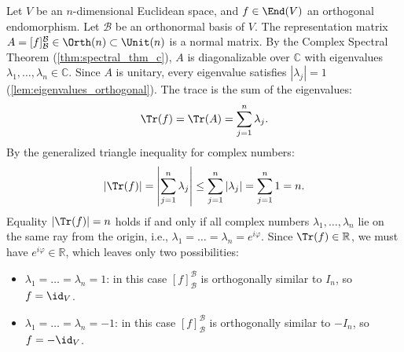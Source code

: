 \begin{exercisesolution}
\label{sol:trace_orthogonal_endomorphism}
Let $V$ be an $n$-dimensional Euclidean space, and $f \in \End(V)$ an orthogonal endomorphism.
Let $\mathcal{B}$ be an orthonormal basis of $V$.
The representation matrix $A = [f]_\mathcal{B}^\mathcal{B} \in \Orth(n) \subset \Unit(n)$ is a normal matrix.
By the Complex Spectral Theorem (\cref{thm:spectral_thm_c}), $A$ is diagonalizable over $\mathbb{C}$ with eigenvalues $\lambda_1, \dots, \lambda_n \in \mathbb{C}$.
Since $A$ is unitary, every eigenvalue satisfies $|\lambda_j| = 1$ (\cref{lem:eigenvalues_orthogonal}).
The trace is the sum of the eigenvalues:
\[
\Tr(f) = \Tr(A) = \sum_{j=1}^n \lambda_j.
\]
By the generalized triangle inequality for complex numbers:
\[
|\Tr(f)| = \left| \sum_{j=1}^n \lambda_j \right| \le \sum_{j=1}^n |\lambda_j| = \sum_{j=1}^n 1 = n.
\]
Equality $|\Tr(f)| = n$ holds if and only if all complex numbers $\lambda_1, \dots, \lambda_n$ lie on the same ray from the origin, i.e., $\lambda_1 = \dots = \lambda_n = e^{i\varphi}$.
Since $\Tr(f) \in \mathbb{R}$, we must have $e^{i\varphi} \in \mathbb{R}$, which leaves only two possibilities:
\begin{itemize}
    \item $\lambda_1 = \dots = \lambda_n = 1$: in this case $[f]_\mathcal{B}^\mathcal{B}$ is orthogonally similar to $I_n$, so $f = \id_V$.
    \item $\lambda_1 = \dots = \lambda_n = -1$: in this case $[f]_\mathcal{B}^\mathcal{B}$ is orthogonally similar to $-I_n$, so $f = -\id_V$. \qedhere
\end{itemize}
\end{exercisesolution}

